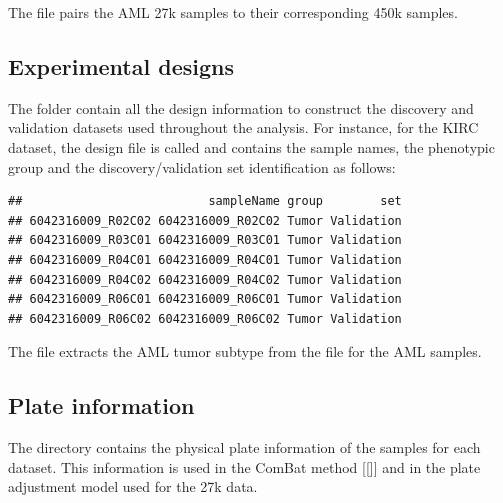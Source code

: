\documentclass[12pt]{article}
\begin{document}
The file  pairs the AML 27k samples to their corresponding 450k samples.


\subsection{Experimental designs}

The folder  contain all the design information to construct the discovery and validation datasets used throughout the analysis. For instance, for the KIRC dataset, the design file is called  and contains the sample names, the phenotypic group and the discovery/validation set identification as follows:

\begin{knitrout}
\color{fgcolor}\begin{kframe}
\begin{alltt}
\hlstd{(} \hlstd{))}
\hlstd{(}\hlstd{)}
\end{alltt}
\begin{verbatim}
##                          sampleName group        set
## 6042316009_R02C02 6042316009_R02C02 Tumor Validation
## 6042316009_R03C01 6042316009_R03C01 Tumor Validation
## 6042316009_R04C01 6042316009_R04C01 Tumor Validation
## 6042316009_R04C02 6042316009_R04C02 Tumor Validation
## 6042316009_R06C01 6042316009_R06C01 Tumor Validation
## 6042316009_R06C02 6042316009_R06C02 Tumor Validation
\end{verbatim}
\end{kframe}
\end{knitrout}


The file  extracts the AML tumor subtype from the file  for the AML samples. 

\subsection{Plate information}

The directory  contains the physical plate information of the samples for each dataset. This information is used in the ComBat method [[]] and in the plate adjustment model used for the 27k data. 
\end{document}
